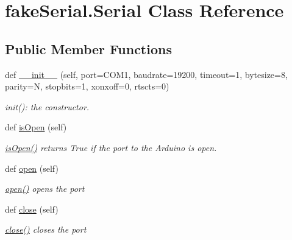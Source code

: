 \hypertarget{classfake_serial_1_1_serial}{}\section{fake\+Serial.\+Serial Class Reference}
\label{classfake_serial_1_1_serial}
\subsection*{Public Member Functions}
\begin{DoxyCompactItemize}
\item 
def \mbox{\hyperlink{classfake_serial_1_1_serial_abcf3b27b5edb193420574f383ff1603c}{\+\_\+\+\_\+init\+\_\+\+\_\+}} (self, port=\textquotesingle{}C\+O\+M1\textquotesingle{}, baudrate=19200, timeout=1, bytesize=8, parity=\textquotesingle{}N\textquotesingle{}, stopbits=1, xonxoff=0, rtscts=0)
\begin{DoxyCompactList}\small\item\em init()\+: the constructor. \end{DoxyCompactList}\item 
def \mbox{\hyperlink{classfake_serial_1_1_serial_a69cc2297e7c5bfb87de4df789774f3a2}{is\+Open}} (self)
\begin{DoxyCompactList}\small\item\em \mbox{\hyperlink{classfake_serial_1_1_serial_a69cc2297e7c5bfb87de4df789774f3a2}{is\+Open()}} returns True if the port to the Arduino is open. \end{DoxyCompactList}\item 
\mbox{\label{classfake_serial_1_1_serial_a2e4137a108e41f23e49735667d9b4c05}} 
def \mbox{\hyperlink{classfake_serial_1_1_serial_a2e4137a108e41f23e49735667d9b4c05}{open}} (self)
\begin{DoxyCompactList}\small\item\em \mbox{\hyperlink{classfake_serial_1_1_serial_a2e4137a108e41f23e49735667d9b4c05}{open()}} opens the port \end{DoxyCompactList}\item 
\mbox{\label{classfake_serial_1_1_serial_a183f0034571d103c4c90c041e6643557}} 
def \mbox{\hyperlink{classfake_serial_1_1_serial_a183f0034571d103c4c90c041e6643557}{close}} (self)
\begin{DoxyCompactList}\small\item\em \mbox{\hyperlink{classfake_serial_1_1_serial_a183f0034571d103c4c90c041e6643557}{close()}} closes the port \end{DoxyCompactList}\item 

\end{DoxyCompactItemize}
